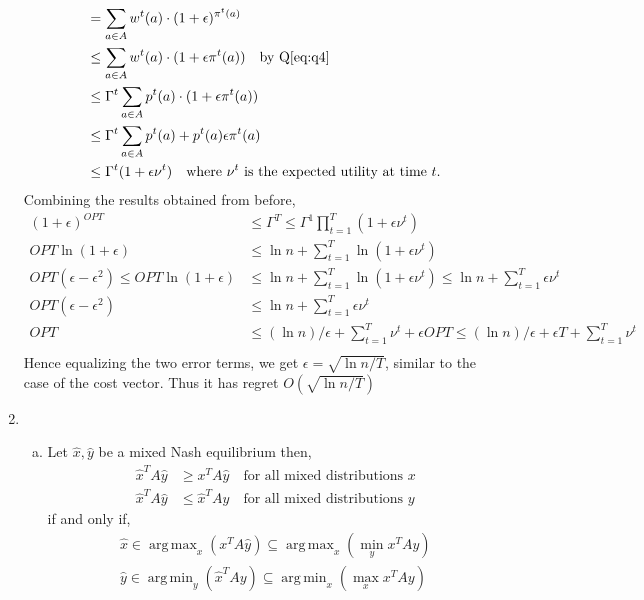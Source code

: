 \documentclass[a4paper,12pt]{article}
\theoremstyle{definition}
\DeclareMathOperator*{\argmax}{arg\,max}
\DeclareMathOperator*{\argmin}{arg\,min}
\begin{document}
\begin{enumerate}
\begin{align*}
&= \sum_{a \in A}w^{t}(a)\cdot (1+\epsilon)^{\pi^t(a)}\\
&\leq \sum_{a \in A}w^{t}(a)\cdot (1+\epsilon\pi^t(a)) \quad \text{by Q\ref{eq:q4}}\\
&\leq \Gamma^t\sum_{a \in A}p^{t}(a)\cdot (1+\epsilon\pi^t(a))\\
&\leq \Gamma^t\sum_{a \in A}p^{t}(a)+p^{t}(a)\epsilon\pi^t(a)\\
&\leq \Gamma^t(1+\epsilon\nu^t)\quad \text{where $\nu^t$ is the expected utility at time $t$.}
\end{align*}
Combining the results obtained from before,
\begin{align*}
(1+\epsilon)^{OPT}&\leq \Gamma^T\leq \Gamma^1\prod_{t=1}^{T}(1+\epsilon \nu^t)\\
OPT \ln (1+\epsilon)&\leq  \ln n + \sum_{t=1}^{T}\ln (1+\epsilon \nu^t)\\
OPT (\epsilon-\epsilon^2)\leq OPT \ln (1+\epsilon)&\leq  \ln n + \sum_{t=1}^{T}\ln (1+\epsilon \nu^t)\leq  \ln n + \sum_{t=1}^{T}\epsilon \nu^t\\
OPT (\epsilon-\epsilon^2)&\leq   \ln n + \sum_{t=1}^{T}\epsilon \nu^t\\
OPT &\leq   (\ln n)/\epsilon + \sum_{t=1}^{T}\nu^t +\epsilon OPT\leq   (\ln n)/\epsilon +\epsilon T + \sum_{t=1}^{T}\nu^t \\
\end{align*}
Hence equalizing the two error terms, we get $\epsilon=\sqrt{\ln n/T}$, similar to the case of the cost vector. Thus it has regret $O(\sqrt{\ln n/T})$
\item 
\begin{enumerate}[(a)]
\item %
Let $\hat{x}, \hat{y}$ be a mixed Nash equilibrium then,
\begin{align}
\hat{x}^TA\hat{y}&\geq x^TA\hat{y} \quad \text{for all mixed distributions $x$}\\
\hat{x}^TA\hat{y}&\leq \hat{x}^TAy \quad \text{for all mixed distributions $y$}
\end{align}
if and only if,
\begin{align*}
\hat{x}\in\argmax_x \left(x^TA \hat{y}\right)\subseteq\argmax_x\left(\min_yx^TAy\right)\\
\hat{y}\in\argmin_y \left(\hat{x}^T Ay\right)\subseteq\argmin_x\left(\max_xx^TAy\right)
\end{align*}


\end{enumerate}
\end{enumerate}
\end{document}
